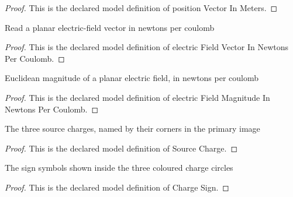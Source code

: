\begin{proof}
  This is the declared model definition of position Vector In Meters.
\end{proof}
\begin{definition}
  \label{def:physics:phyx-mini-0833:phyxminiproblems-problemphyxmini0833-electricfieldvectorinnewtonspercoulomb}
  Read a planar electric-field vector in newtons per coulomb
\end{definition}
\begin{proof}
  This is the declared model definition of electric Field Vector In Newtons Per Coulomb.
\end{proof}
\begin{definition}
  \label{def:physics:phyx-mini-0833:phyxminiproblems-problemphyxmini0833-electricfieldmagnitudeinnewtonspercoulomb}
  Euclidean magnitude of a planar electric field, in newtons per coulomb
\end{definition}
\begin{proof}
  This is the declared model definition of electric Field Magnitude In Newtons Per Coulomb.
\end{proof}
\begin{definition}
  \label{def:physics:phyx-mini-0833:phyxminiproblems-problemphyxmini0833-sourcecharge}
  The three source charges, named by their corners in the primary image
\end{definition}
\begin{proof}
  This is the declared model definition of Source Charge.
\end{proof}
\begin{definition}
  \label{def:physics:phyx-mini-0833:phyxminiproblems-problemphyxmini0833-chargesign}
  The sign symbols shown inside the three coloured charge circles
\end{definition}
\begin{proof}
  This is the declared model definition of Charge Sign.
\end{proof}
